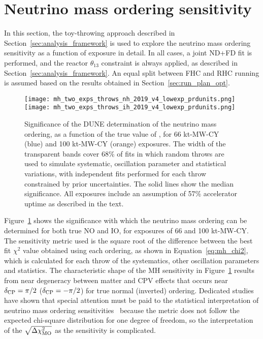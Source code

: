 \section{Neutrino mass ordering sensitivity}
\label{sec:mh_sens}

In this section, the toy-throwing approach described in Section~\ref{sec:analysis_framework} is used to explore the neutrino mass ordering sensitivity as a function of exposure in detail. In all cases, a joint ND+FD fit is performed, and the reactor $\theta_{13}$ constraint is always applied, as described in Section~\ref{sec:analysis_framework}. An equal split between FHC and RHC running is assumed based on the results obtained in Section~\ref{sec:run_plan_opt}.

\begin{figure}[htbp]
  \centering
  \texttt{[image: mh\_two\_exps\_throws\_nh\_2019\_v4\_lowexp\_prdunits.png]}
  \texttt{[image: mh\_two\_exps\_throws\_ih\_2019\_v4\_lowexp\_prdunits.png]}
  \caption{Significance of the DUNE determination of the neutrino mass ordering, as a function of the true value of \deltacp, for 66 kt-MW-CY (blue) and 100 kt-MW-CY (orange) exposures. The width of the transparent bands cover 68\% of fits in which random throws are used to simulate systematic, oscillation parameter and statistical variations, with independent fits performed for each throw constrained by prior uncertainties. The solid lines show the median significance. All exposures include an assumption of 57\% accelerator uptime as described in the text.}
  \label{fig:mh_bands}
\end{figure}
Figure~\ref{fig:mh_bands} shows the significance with which the neutrino mass ordering can be determined for both true NO and IO, for exposures of 66 and 100 kt-MW-CY. The sensitivity metric used is the square root of the difference between the best fit $\chi^{2}$ value obtained using each ordering, as shown in Equation~\ref{eq:mh_chi2}, which is calculated for each throw of the systematics, other oscillation parameters and statistics. The characteristic shape of the MH sensitivity in Figure~\ref{fig:mh_bands} results from near degeneracy between matter and CPV effects that occurs near $\delta_{\rm CP}=\pi/2$ ($\delta_{\rm CP}=-\pi/2$) for true normal (inverted) ordering. Dedicated studies have shown that special attention must be paid to the statistical interpretation of neutrino mass ordering sensitivities~\cite{Ciuffoli:2013rza,Qian:2012zn,Blennow:2013oma} because the \dchisqMO metric does not follow the expected chi-square distribution for one degree of freedom, so the interpretation of the $\sqrt{\Delta\chi^{2}_{\mathrm{MO}}}$ as the sensitivity is complicated.

